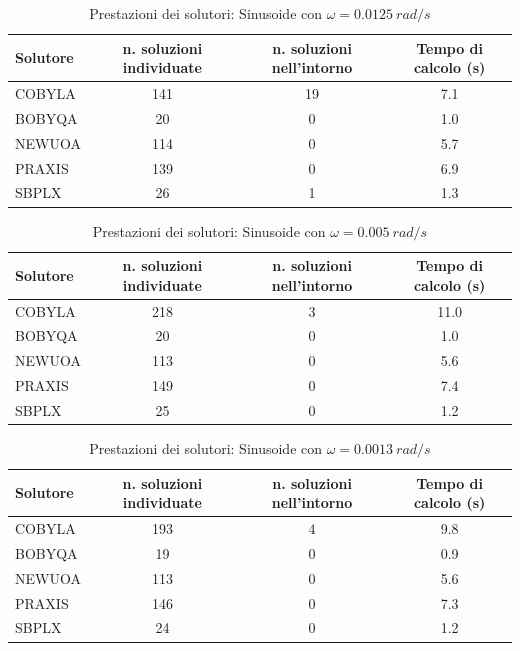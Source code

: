 \documentclass[a4paper,12pt]{report}
\begin{document}
\begin{table}[H]
  \caption{Prestazioni dei solutori: Sinusoide con $\omega = 0.0125~rad/s$}
  \label{tab:prestazioni_sol0125}
  \center
    \begin{tabular}{lSSS}
      \toprule
      {Solutore} & {n. soluzioni individuate} & {n. soluzioni nell'intorno} & {Tempo di calcolo (s)} \\
      \midrule
      COBYLA & 141  &    19     &  7.1 \\
      BOBYQA & 20   &     0     &   1.0 \\
      NEWUOA & 114   &     0    &   5.7 \\
      PRAXIS & 139   &     0     &  6.9 \\
      SBPLX  & 26   &     1     &   1.3 \\
      \bottomrule
    \end{tabular}
\end{table}

\begin{table}
  \caption{Prestazioni dei solutori: Sinusoide con $\omega = 0.005~rad/s$}
  \label{tab:prestazioni_sol005}
  \center
    \begin{tabular}{lSSS}
      \toprule
      {Solutore} & {n. soluzioni individuate} & {n. soluzioni nell'intorno} & {Tempo di calcolo (s)} \\
      \midrule
      COBYLA & 218  &     3     &  11.0 \\
      BOBYQA & 20   &     0     &   1.0 \\
      NEWUOA & 113  &     0     &   5.6 \\
      PRAXIS & 149  &     0     &  7.4 \\
      SBPLX & 25   &     0     &   1.2 \\
      \bottomrule
    \end{tabular}
\end{table}

\begin{table}[H]
  \caption{Prestazioni dei solutori: Sinusoide con $\omega = 0.0013~rad/s$}
  \label{tab:prestazioni_sol0013}
  \center
    \begin{tabular}{lSSS}
      \toprule
      {Solutore} & {n. soluzioni individuate} & {n. soluzioni nell'intorno} & {Tempo di calcolo (s)} \\
      \midrule
      COBYLA & 193  &     4     &  9.8 \\
      BOBYQA & 19   &     0     &  0.9 \\
      NEWUOA & 113   &     0    &  5.6 \\
      PRAXIS & 146   &     0    &  7.3 \\
      SBPLX  & 24   &     0     &  1.2 \\
      \bottomrule
    \end{tabular}
\end{table}
\end{document}
